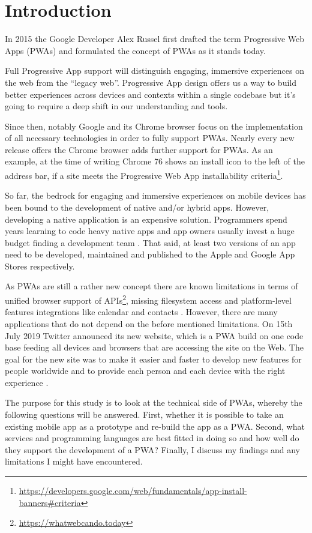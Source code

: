 \chapter{Introduction}

In 2015 the Google Developer Alex Russel first drafted the term Progressive Web Apps (PWAs) and formulated the concept of PWAs as it stands today.

Full Progressive App support will distinguish engaging, immersive experiences on the web from the “legacy web”. Progressive App design offers us a way to build better experiences across devices and contexts within a single codebase but it’s going to require a deep shift in our understanding and tools. \citep{russellProgressiveWebApps2015}

Since then, notably Google and its Chrome browser focus on the implementation of all necessary technologies in order to fully support PWAs. Nearly every new release offers the Chrome browser adds further support for PWAs. As an example, at the time of writing Chrome 76 shows an install icon to the left of the address bar, if a site meets the Progressive Web App installability criteria\footnote{\url{https://developers.google.com/web/fundamentals/app-install-banners\#criteria}}.

So far, the bedrock for engaging and immersive experiences on mobile devices has been bound to the development of native and/or hybrid apps. However, developing a native application is an expensive solution. Programmers spend years learning to code heavy native apps and app owners usually invest a huge budget finding a development team \citep{nguyen2019progressive}. That said, at least two versions of an app need to be developed, maintained and published to the Apple and Google App Stores respectively.

As PWAs are still a rather new concept there are known limitations in terms of unified browser support of APIs\footnote{\url{https://whatwebcando.today}}, missing filesystem access and platform-level features integrations like calendar and contacts \citep{biorn-hansenProgressiveWebApps2018,malavoltaNativeAppsWeb2016}. However, there are many applications that do not depend on the before mentioned limitations. On 15th July 2019 Twitter announced its new website, which is a PWA build on one code base feeding all devices and browsers that are accessing the site on the Web. The goal for the new site was to make it easier and faster to develop new features for people worldwide and to provide each person and each device with the right experience \citep{croomBuildingNewTwitter2019}.

The purpose for this study is to look at the technical side of PWAs, whereby the following questions will be answered. First, whether it is possible to take an existing mobile app as a prototype and re-build the app as a PWA. Second, what services and programming languages are best fitted in doing so and how well do they support the development of a PWA? Finally, I discuss my findings and any limitations I might have encountered.
